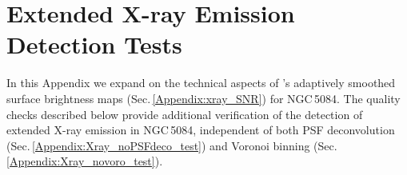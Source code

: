 \documentclass[modern]{aastex631}
\begin{document}
\vspace{5mm}




\appendix

\section{Extended X-ray Emission Detection Tests}
\label{Appendix:xray_tests}

In this Appendix we expand on the technical aspects of \SAUNAS's \citep{borlaff+2024apj967_169} adaptively smoothed surface brightness maps (Sec.\,\ref{Appendix:xray_SNR}) for NGC\,5084. The quality checks described below provide additional verification of the detection of  extended X-ray emission in NGC\,5084, independent of both PSF deconvolution (Sec.\,\ref{Appendix:Xray_noPSFdeco_test}) and Voronoi binning (Sec.\,\ref{Appendix:Xray_novoro_test}).
\end{document}
